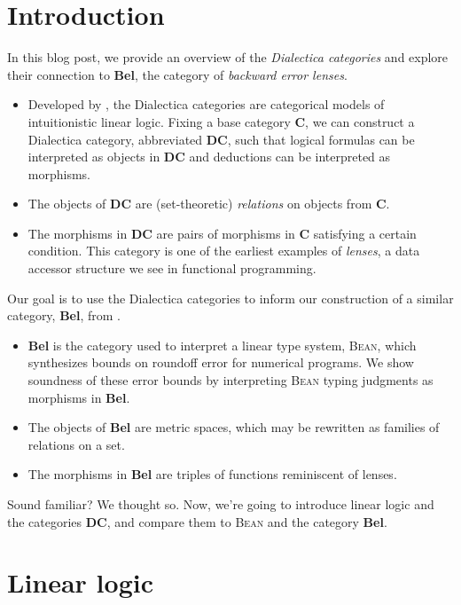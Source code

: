 \documentclass[a4paper]{article}
\newcommand{\DC}{\textbf{DC}}
\newcommand{\C}{\textbf{C}}
\newcommand{\Bel}{\textbf{Bel}}
\newcommand{\Bean}{\textsc{Bean}}
\begin{document}
\section{Introduction}
In this blog post, we provide an overview of the \emph{Dialectica categories} and explore their connection to \Bel{}, the category of \emph{backward error lenses}.
\begin{itemize}
    \item Developed by \cite{de1991dialectica}, the Dialectica categories are categorical models of intuitionistic linear logic. Fixing a base category \C, we can construct a Dialectica category, abbreviated \DC{}, such that logical formulas can be interpreted as objects in \DC{} and deductions can be interpreted as morphisms. 
    \item The objects of \DC{} are (set-theoretic) \emph{relations} on objects from \C.
    \item The morphisms in \DC{} are pairs of morphisms in \C{} satisfying a certain condition. This category is one of the earliest examples of \emph{lenses}, a data accessor structure we see in functional programming.
\end{itemize} 

Our goal is to use the Dialectica categories to inform our construction of a similar category, \Bel, from \cite{kellison2025bean}.
\begin{itemize}
    \item \Bel{} is the category used to interpret a linear type system, \Bean{}, which synthesizes bounds on roundoff error for numerical programs. We show soundness of these error bounds by interpreting \Bean{} typing judgments as morphisms in \textbf{Bel}.
    \item The objects of \Bel{} are metric spaces, which may be rewritten as families of relations on a set.
    \item The morphisms in \Bel{} are triples of functions reminiscent of lenses. 
\end{itemize}
Sound familiar? We thought so. Now, we're going to introduce linear logic and the categories \DC{}, and compare them to \Bean{} and the category \Bel{}.


\section{Linear logic}
\end{document}

